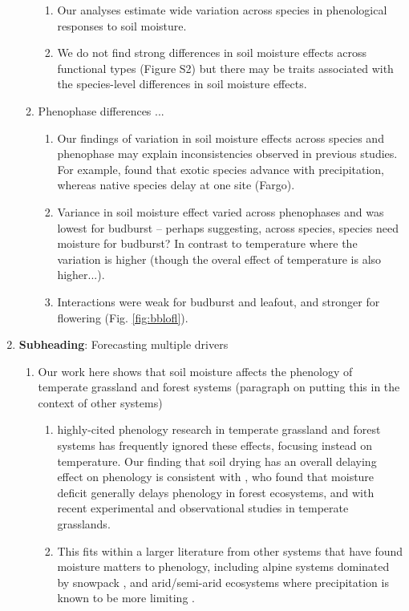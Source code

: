 \documentclass[11pt,letter]{article}
\begin{document}
\begin{enumerate}
\begin{enumerate}
\begin{enumerate}
\item Our analyses estimate wide variation across species in phenological responses to soil moisture. 
\item We do not find strong differences in soil moisture effects across functional types (Figure S2) but there may be traits associated with the species-level differences in soil moisture effects.  
\end{enumerate}
\item Phenophase differences ... 
\begin{enumerate}
\item Our findings of variation in soil moisture effects across species and phenophase may explain inconsistencies observed in previous studies. For example, \cite{wolkovich2012} found that exotic species advance with precipitation, whereas native species delay at one site (Fargo). 
\item Variance in soil moisture effect varied across phenophases and was lowest for budburst -- perhaps suggesting, across species, species need moisture for budburst? In contrast to temperature where the variation is higher (though the overal effect of temperature is also higher...). 
\item Interactions were weak for budburst and leafout, and stronger for flowering (Fig. \ref{fig:bblofl}).
\end{enumerate}
\end{enumerate}
\item {\bf Subheading}: Forecasting multiple drivers 
\begin{enumerate}
\item Our work here shows that soil moisture affects the phenology of temperate grassland and forest systems (paragraph on putting this in the context of other systems)
\begin{enumerate}
\item highly-cited phenology research in temperate grassland and forest systems has frequently ignored these effects, focusing instead on temperature. Our finding that soil drying has an overall delaying effect on phenology is consistent with \citet{seyed2018}, who found that moisture deficit generally delays phenology in forest ecosystems, and with recent experimental \citep{liu2022} and observational \citep{tao2020} studies in temperate grasslands. 
\item This fits within a larger literature from other systems that have found moisture matters to phenology, including alpine systems dominated by snowpack \citep[e.g.,][]{dunne2004,sherwood2017}, and arid/semi-arid ecosystems where precipitation is known to be more limiting \citep{tao2019}. 

\end{enumerate}
\end{enumerate}
\end{enumerate}
\end{document}
